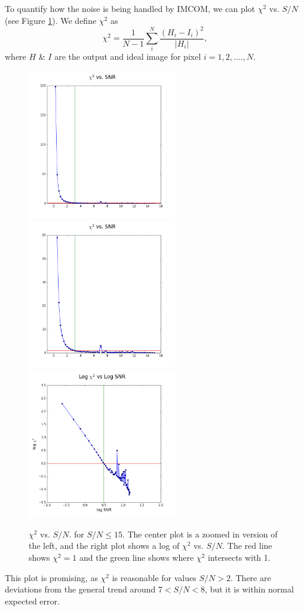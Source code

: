 \documentclass[12pt,preprint]{aastex6}
\begin{document}
To quantify how the noise is being handled by IMCOM, we can plot $\chi^{2}$ vs. $S/N$ (see Figure \ref{fig:L2_vs_SNR}). We define $\chi^{2}$ as
\begin{equation}
\chi^{2}=\frac{1}{N-1}\sum_{i}^{N}\frac{(H_{i}-I_{i})^{2}}{|H_{i}|},
\label{Eq:chi2}
\end{equation}
where $H$ \& $I$ are the output and ideal image for pixel $i=1,2,....,N$.
\begin{figure}[!htbp]
\centering
\advance\leftskip-1.0cm
\advance\rightskip-1.0cm
\includegraphics[height=65mm,width=65mm]{f6a.png}
\includegraphics[height=65mm,width=65mm]{f6b.png}
\includegraphics[height=65mm,width=65mm]{f6c.png}
\caption{$\chi^{2}$ vs. $S/N$. for $S/N\leq15$. The center plot is a zoomed in version of the left, and the right plot shows a log of $\chi^{2}$ vs. $S/N$. The red line shows $\chi^{2}=1$ and the green line shows where $\chi^{2}$ intersects with 1.}
\label{fig:L2_vs_SNR}
\end{figure}
This plot is promising, as $\chi^{2}$ is reasonable for values $S/N>2$. There are deviations from the general trend around 7$<S/N<8$, but it is within normal expected error.
\end{document}
